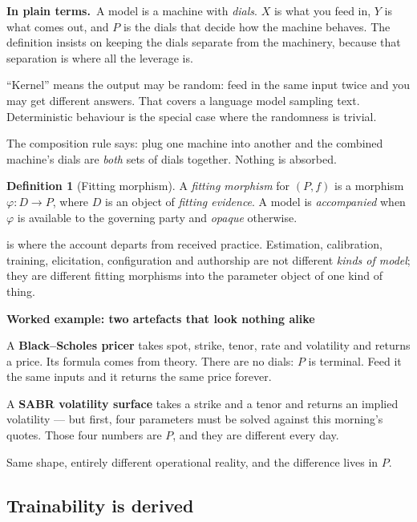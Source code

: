 \documentclass[11pt,a4paper]{article}
\renewcommand{\_}{\oldunderscore\allowbreak}
\theoremstyle{plain}
\theoremstyle{definition}
\newtheorem{definition}[theorem]{Definition}
\theoremstyle{definition}
\theoremstyle{remark}
\newcommand{\defn}[1]{\emph{#1}}
\newcommand{\pt}{\textbf{In plain terms.}\ }
\newcommand{\wk}[1]{\textbf{Worked example: #1}\par\smallskip}
\begin{document}
\begin{plain}
\pt A model is a machine with \emph{dials}. $X$ is what you feed in, $Y$ is what comes out, and $P$ is
the dials that decide how the machine behaves. The definition insists on keeping the dials separate from
the machinery, because that separation is where all the leverage is.

``Kernel'' means the output may be random: feed in the same input twice and you may get different
answers. That covers a language model sampling text. Deterministic behaviour is the special case where
the randomness is trivial.

The composition rule says: plug one machine into another and the combined machine's dials are
\emph{both} sets of dials together. Nothing is absorbed.
\end{plain}

\begin{definition}[Fitting morphism]\label{def:fitting}
A \defn{fitting morphism} for $(P,f)$ is a morphism $\varphi \colon D \to P$, where $D$ is an object of
\defn{fitting evidence}. A model is \defn{accompanied} when $\varphi$ is available to the governing
party and \defn{opaque} otherwise.
\end{definition}

 is where the account departs from received practice. Estimation, calibration,
training, elicitation, configuration and authorship are not different \emph{kinds of model}; they are
different fitting morphisms into the parameter object of one kind of thing.

\begin{worked}
\wk{two artefacts that look nothing alike}
A \textbf{Black--Scholes pricer} takes spot, strike, tenor, rate and volatility and returns a price. Its
formula comes from theory. There are no dials: $P$ is terminal. Feed it the same inputs and it returns
the same price forever.

A \textbf{SABR volatility surface} takes a strike and a tenor and returns an implied volatility --- but
first, four parameters must be solved against this morning's quotes. Those four numbers are $P$, and
they are different every day.

Same shape, entirely different operational reality, and the difference lives in $P$.
\end{worked}

\subsection{Trainability is derived}
\end{document}
